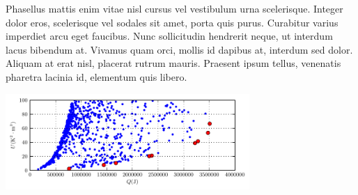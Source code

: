 \documentclass[portrait, a1paper, fontscale=0.5]{baposter}
\begin{document}
\begin{poster}
{\begin{center}
	\begin{minipage}{25em}
		Phasellus mattis enim vitae nisl cursus vel vestibulum urna scelerisque. Integer dolor eros, scelerisque vel sodales sit amet, porta quis purus. Curabitur varius imperdiet arcu eget faucibus. Nunc sollicitudin hendrerit neque, ut interdum lacus bibendum at. Vivamus quam orci, mollis id dapibus at, interdum sed dolor. Aliquam at erat nisl, placerat rutrum mauris. Praesent ipsum tellus, venenatis pharetra lacinia id, elementum quis libero.
	\end{minipage}
	\begin{minipage}{25em}
		\centering
		\includegraphics[width=25em]{optimization/results.pdf}
	\end{minipage}
\end{center}
}

\end{poster}
\end{document}
